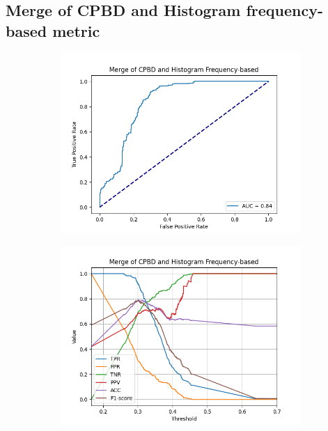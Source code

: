 \subsection{Merge of CPBD and Histogram frequency-based metric}
\begin{figure}[H]
    \centering
    \begin{subfigure}[t]{0.48\textwidth}
        \includegraphics[width=\textwidth]{Figures/results_on_thresholds/output_roc_cpbd_hf.png}
        \caption{}
        \label{fig:CPBD_HF_roc}
    \end{subfigure}\hspace{1em}
    \begin{subfigure}[t]{0.48\textwidth}
        \includegraphics[width=\textwidth]{Figures/results_on_thresholds/threshold_test_scores_cpbd_hf.png}

\end{subfigure}
\end{figure}
